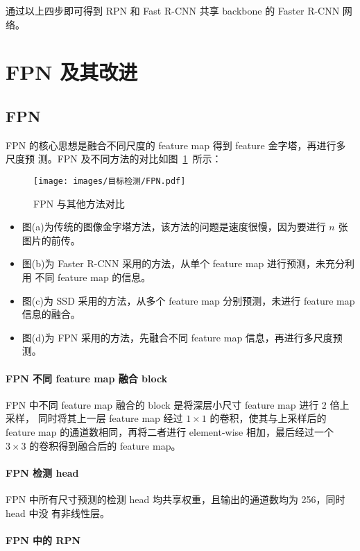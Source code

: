 通过以上四步即可得到 RPN 和 Fast R-CNN 共享 backbone 的 Faster R-CNN 网络。

\section{FPN 及其改进}
\label{sec:FPN}

\subsection{FPN}
\label{subsec:FPN}
FPN 的核心思想是融合不同尺度的 feature map 得到 feature 金字塔，再进行多尺度预
测。FPN 及不同方法的对比如图~\ref{fig:FPN}~所示：

\begin{figure}[ht]
  \centering
  \texttt{[image: images/目标检测/FPN.pdf]}
  \caption{FPN 与其他方法对比}
  \label{fig:FPN}
\end{figure}

\begin{itemize}
  \item 图(a)为传统的图像金字塔方法，该方法的问题是速度很慢，因为要进行 $n$ 张
    图片的前传。
  \item 图(b)为 Faster R-CNN 采用的方法，从单个 feature map 进行预测，未充分利用
    不同 feature map 的信息。
  \item 图(c)为 SSD 采用的方法，从多个 feature map 分别预测，未进行 feature map
    信息的融合。
  \item 图(d)为 FPN 采用的方法，先融合不同 feature map 信息，再进行多尺度预测。
\end{itemize}

\paragraph{FPN 不同 feature map 融合 block}
FPN 中不同 feature map 融合的 block 是将深层小尺寸 feature map 进行 2 倍上采样，
同时将其上一层 feature map 经过 $1 \times 1$ 的卷积，使其与上采样后的 feature
map 的通道数相同，再将二者进行 element-wise 相加，最后经过一个 $3 \times 3$
的卷积得到融合后的 feature map。

\paragraph{FPN 检测 head}
FPN 中所有尺寸预测的检测 head 均共享权重，且输出的通道数均为 256，同时 head 中没
有非线性层。

\paragraph{FPN 中的 RPN}

